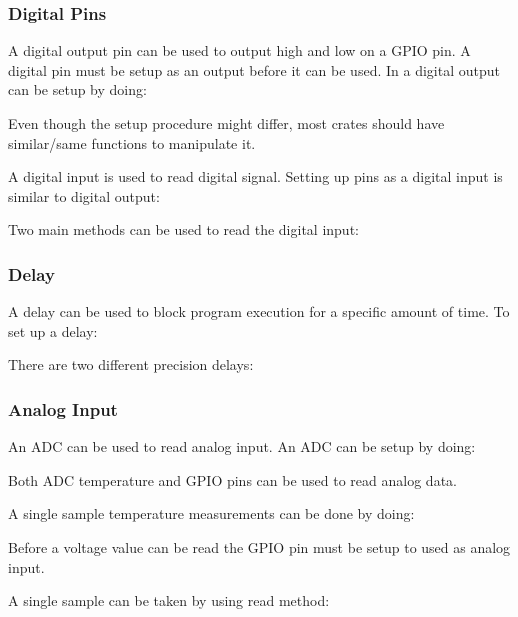 \documentclass{beamer}
\begin{document}
\begin{frame}[allowframebreaks]
  \frametitle{Digital Pins}
  A digital output pin can be used to output high and low on a GPIO pin. A digital pin must be setup as an output before it can be used. In  a digital output can be setup by doing:
  

  Even though the setup procedure might differ, most crates should have similar/same functions to manipulate it.
  
  

  A digital input is used to read digital signal. Setting up pins as a digital input is similar to digital output:
  

  \pagebreak

  Two main methods can be used to read the digital input:
  
  
\end{frame}

\begin{frame}
  \frametitle{Delay}
  A delay can be used to block program execution for a specific amount of time. To set up a delay:
  

  There are two different precision delays:
  
  
\end{frame}

\begin{frame}[allowframebreaks]
  \frametitle{Analog Input}
  An ADC can be used to read analog input. An ADC can be setup by doing:
  

  Both ADC temperature and GPIO pins can be used to read analog data.

  A single sample temperature measurements can be done by doing:
  

  \pagebreak

  Before a voltage value can be read the GPIO pin must be setup to used as analog input.
  

  A single sample can be taken by using read method:
  
\end{frame}
\end{document}
